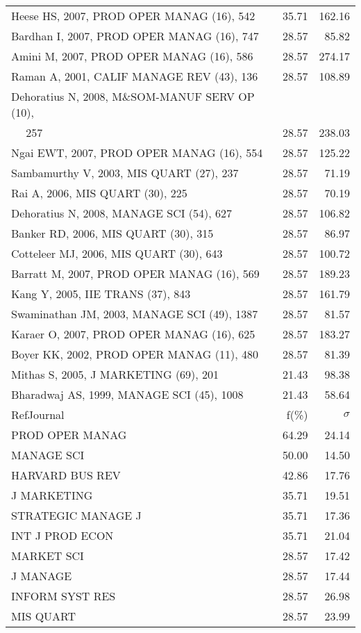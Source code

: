 \documentclass[a4paper,11pt]{report}
\begin{document}
\begin{landscape}
\begin{table}[!ht]
{\begin{tabular}{|l r r|}
Heese HS, 2007, PROD OPER MANAG (16), 542 & 35.71 & 162.16\\
Bardhan I, 2007, PROD OPER MANAG (16), 747 & 28.57 & 85.82\\
Amini M, 2007, PROD OPER MANAG (16), 586 & 28.57 & 274.17\\
Raman A, 2001, CALIF MANAGE REV (43), 136 & 28.57 & 108.89\\
Dehoratius N, 2008, M\&SOM-MANUF SERV OP (10), &  & \\
$\quad$ 257 & 28.57 & 238.03\\
Ngai EWT, 2007, PROD OPER MANAG (16), 554 & 28.57 & 125.22\\
Sambamurthy V, 2003, MIS QUART (27), 237 & 28.57 & 71.19\\
Rai A, 2006, MIS QUART (30), 225 & 28.57 & 70.19\\
Dehoratius N, 2008, MANAGE SCI (54), 627 & 28.57 & 106.82\\
Banker RD, 2006, MIS QUART (30), 315 & 28.57 & 86.97\\
Cotteleer MJ, 2006, MIS QUART (30), 643 & 28.57 & 100.72\\
Barratt M, 2007, PROD OPER MANAG (16), 569 & 28.57 & 189.23\\
Kang Y, 2005, IIE TRANS (37), 843 & 28.57 & 161.79\\
Swaminathan JM, 2003, MANAGE SCI (49), 1387 & 28.57 & 81.57\\
Karaer O, 2007, PROD OPER MANAG (16), 625 & 28.57 & 183.27\\
Boyer KK, 2002, PROD OPER MANAG (11), 480 & 28.57 & 81.39\\
Mithas S, 2005, J MARKETING (69), 201 & 21.43 & 98.38\\
Bharadwaj AS, 1999, MANAGE SCI (45), 1008 & 21.43 & 58.64\\
\hline
\hline
RefJournal & f(\%) & $\sigma$\\
\hline
PROD OPER MANAG & 64.29 & 24.14\\
MANAGE SCI & 50.00 & 14.50\\
HARVARD BUS REV & 42.86 & 17.76\\
J MARKETING & 35.71 & 19.51\\
STRATEGIC MANAGE J & 35.71 & 17.36\\
INT J PROD ECON & 35.71 & 21.04\\
MARKET SCI & 28.57 & 17.42\\
J MANAGE & 28.57 & 17.44\\
INFORM SYST RES & 28.57 & 26.98\\
MIS QUART & 28.57 & 23.99\\
\hline
\end{tabular}
}
\end{table}

\end{landscape}
\end{document}
